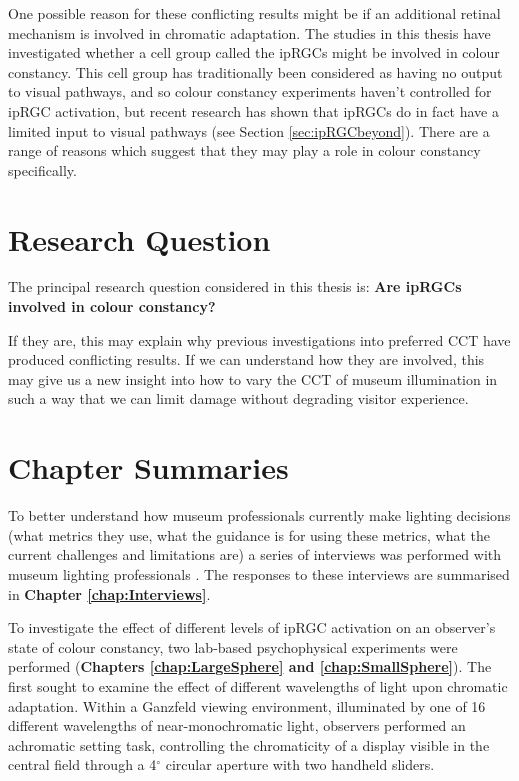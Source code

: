 One possible reason for these conflicting results might be if an additional retinal mechanism is involved in chromatic adaptation. The studies in this thesis have investigated whether a cell group called the \glspl{ipRGC} might be involved in colour constancy. This cell group has traditionally been considered as having no output to visual pathways, and so colour constancy experiments haven't controlled for \gls{ipRGC} activation, but recent research has shown that \glspl{ipRGC} do in fact have a limited input to visual pathways (see Section \ref{sec:ipRGCbeyond}). There are a range of reasons which suggest that they may play a role in colour constancy specifically.

\section{Research Question}

The principal research question considered in this thesis is: \textbf{Are \glspl{ipRGC} involved in colour constancy?}

If they are, this may explain why previous investigations into preferred \gls{CCT} have produced conflicting results. If we can understand how they are involved, this may give us a new insight into how to vary the \gls{CCT} of museum illumination in such a way that we can limit damage without degrading visitor experience.

\section{Chapter Summaries}

To better understand how museum professionals currently make lighting decisions (what metrics they use, what the guidance is for using these metrics, what the current challenges and limitations are) a series of interviews was performed with museum lighting professionals \citep{garside_how_2017}. The responses to these interviews are summarised in \textbf{Chapter \ref{chap:Interviews}}.

To investigate the effect of different levels of \gls{ipRGC} activation on an observer's state of colour constancy, two lab-based psychophysical experiments were performed (\textbf{Chapters \ref{chap:LargeSphere} and \ref{chap:SmallSphere}}). The first sought to examine the effect of different wavelengths of light upon chromatic adaptation. Within a Ganzfeld viewing environment, illuminated by one of 16 different wavelengths of near-monochromatic light, observers performed an achromatic setting task, controlling the chromaticity of a display visible in the central field through a 4$^{\circ}$ circular aperture with two handheld sliders.

